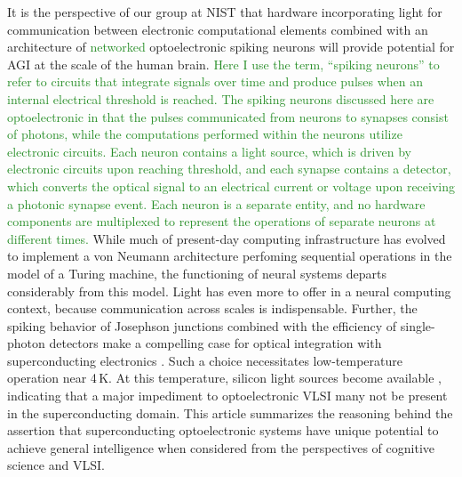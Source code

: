\documentclass{article}
\begin{document}
\begin{multicols}{2}
It is the perspective of our group at NIST that hardware incorporating light for communication between electronic computational elements combined with an architecture of \textcolor{ForestGreen}{networked} optoelectronic spiking neurons will provide potential for AGI at the scale of the human brain. \textcolor{ForestGreen}{Here I use the term, ``spiking neurons'' to refer to circuits that integrate signals over time and produce pulses when an internal electrical threshold is reached. The spiking neurons discussed here are optoelectronic in that the pulses communicated from neurons to synapses consist of photons, while the computations performed within the neurons utilize electronic circuits. Each neuron contains a light source, which is driven by electronic circuits upon reaching threshold, and each synapse contains a detector, which converts the optical signal to an electrical current or voltage upon receiving a photonic synapse event. Each neuron is a separate entity, and no hardware components are multiplexed to represent the operations of separate neurons at different times.} While much of present-day computing infrastructure has evolved to implement a von Neumann architecture perfoming sequential operations in the model of a Turing machine, the functioning of neural systems departs considerably from this model. Light has even more to offer in a neural computing context, because communication across scales is indispensable. Further, the spiking behavior of Josephson junctions combined with the efficiency of single-photon detectors make a compelling case for optical integration with superconducting electronics \cite{shbu2017,sh2018}. Such a choice necessitates low-temperature operation near 4\,K. At this temperature, silicon light sources become available \cite{buch2017}, indicating that a major impediment to optoelectronic VLSI many not be present in the superconducting domain. This article summarizes the reasoning behind the assertion that superconducting optoelectronic systems have unique potential to achieve general intelligence when considered from the perspectives of cognitive science and VLSI.


\end{multicols}
\end{document}
